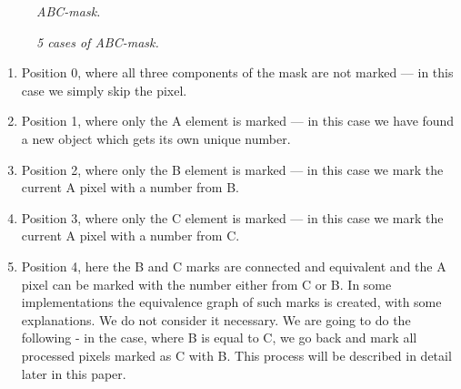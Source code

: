 \documentclass[12pt,a4paper,oneside,titlepage]{article}
\begin{document}



\begin{figure}[h]
  \caption{\textit{ABC-mask.}}
  \label{fig:abc_mask}
\end{figure}



\begin{figure}[h]
  \caption{\textit{5 cases of ABC-mask.}}
  \label{fig:abc_all_cases}
\end{figure}


\begin{enumerate}
	\item Position 0, where all three components of the mask are not marked — in this case we simply skip the pixel.
	\item Position 1, where only the A element is marked — in this case we have found a new object which gets its own unique number.
	\item Position 2, where only the B element is marked — in this case we mark the current  A pixel with a number from B.
	\item Position 3, where only the C element is marked — in this case we mark the current  A pixel with a number from C.
	\item Position 4, here the B and C marks are connected and equivalent  and the A pixel can be marked with the number either from C or B. In some implementations the equivalence graph of such marks is created, with some explanations. We do not consider it necessary. We are going to do the following - in the case, where B is equal to C, we go back and mark all processed pixels marked as C with B. This process will be described in detail later in this paper. 
\end{enumerate}
\end{document}
